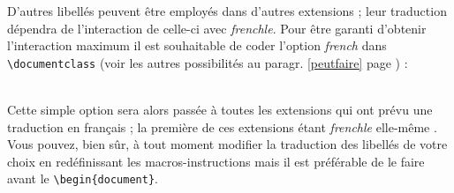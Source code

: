 \documentclass[a4paper,12pt,openright]{article}
\begin{document}
D’autres libellés peuvent être employés dans d’autres extensions ; leur traduction
dépendra de l’interaction de celle-ci avec \textit{frenchle}. Pour être garanti
d’obtenir l’interaction maximum il est souhaitable de coder l’option \textsl{french}
dans {\tt{\backslash}documentclass}
 (voir les autres possibilités au paragr. \ref{peutfaire} page \pageref{peutfaire}) :\\[1em]
\rule{0pt}{1em}\hfill{}\hfill\rule{0pt}{1em}\\[.5em]

Cette simple option sera alors passée à toutes les extensions qui ont prévu
une traduction en français ; la première de ces extensions étant \textit{frenchle} 
elle-même .
Vous pouvez, bien sûr, à tout moment modifier la traduction des libellés de
votre choix en redéfinissant les macros-instructions mais il est préférable de le
faire avant le \texttt{{\backslash}begin\{document\}}.
\end{document}
